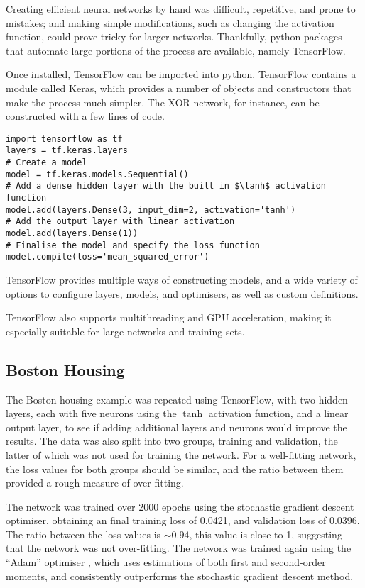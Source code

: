 Creating efficient neural networks by hand was difficult, repetitive, and prone
to mistakes; and making simple modifications, such as changing the activation
function, could prove tricky for larger networks.
Thankfully, python packages that automate large portions of the process are
available, namely TensorFlow.

Once installed, TensorFlow can be imported into python.
TensorFlow contains a module called Keras, which provides a number of objects
and constructors that make the process much simpler.
The XOR network, for instance, can be constructed with a few lines of code.
\begin{verbatim}
import tensorflow as tf
layers = tf.keras.layers
# Create a model
model = tf.keras.models.Sequential()
# Add a dense hidden layer with the built in $\tanh$ activation function
model.add(layers.Dense(3, input_dim=2, activation='tanh')
# Add the output layer with linear activation
model.add(layers.Dense(1))
# Finalise the model and specify the loss function
model.compile(loss='mean_squared_error')
\end{verbatim}
TensorFlow provides multiple ways of constructing models, and a wide variety of
options to configure layers, models, and optimisers, as well as custom
definitions.

TensorFlow also supports multithreading and GPU acceleration, making it
especially suitable for large networks and training sets.



\subsection{Boston Housing}

The Boston housing example was repeated using TensorFlow, with two hidden
layers, each with five neurons using the $\tanh$ activation function, and a
linear output layer, to see if adding additional layers and neurons would
improve the results.
The data was also split into two groups, training and validation, the latter of
which was not used for training the network.
For a well-fitting network, the loss values for both groups should be similar,
and the ratio between them provided a rough measure of over-fitting.

The network was trained over 2000 epochs using the stochastic gradient descent
optimiser, obtaining an final training loss of 0.0421, and validation loss of
0.0396.
The ratio between the loss values is $\sim0.94$, this value is close to 1,
suggesting that the network was not over-fitting.
\vspace{-2em}
\newpage
The network was trained again using the ``Adam'' optimiser
\citep{Kingma:2014:Adam}, which uses estimations of both first and second-order
moments, and consistently outperforms the stochastic gradient descent method.

